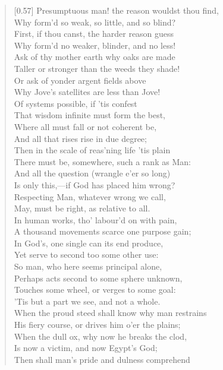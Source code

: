 \begin{verse}[0.57\textwidth]
Presumptuous man! the reason wouldst thou find,\\
Why form'd so weak, so little, and so blind?\\
First, if thou canst, the harder reason guess\\
Why form'd no weaker, blinder, and no less!\\
Ask of thy mother earth why oaks are made\\
Taller or stronger than the weeds they shade!\\
Or ask of yonder argent fields above\\
Why Jove's satellites are less than Jove!\\
\vin Of systems possible, if 'tis confest\\
That wisdom infinite must form the best,\\
Where all must fall or not coherent be,\\
And all that rises rise in due degree;\\
Then in the scale of reas'ning life 'tis plain\\
There must be, somewhere, such a rank as Man:\\
And all the question (wrangle e'er so long)\\
Is only this,---if God has placed him wrong?\\
\vin Respecting Man, whatever wrong we call,\\
May, must be right, as relative to all.\\
In human works, tho' labour'd on with pain,\\
A thousand movements scarce one purpose gain;\\
In God's, one single can its end produce,\\
Yet serve to second too some other use:\\
So man, who here seems principal alone,\\
Perhaps acts second to some sphere unknown,\\
Touches some wheel, or verges to some goal:\\
'Tis but a part we see, and not a whole.\\
\vin When the proud steed shall know why man restrains\\
His fiery course, or drives him o'er the plains;\\
When the dull ox, why now he breaks the clod,\\
Is now a victim, and now Egypt's God;\\
Then shall man's pride and dulness comprehend\\

\end{verse}

